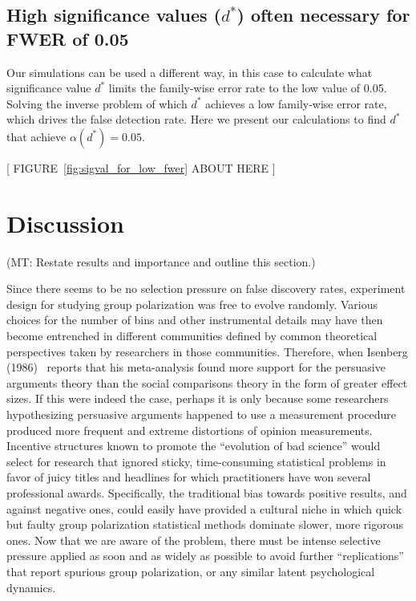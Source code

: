 \documentclass[preview]{article}
\newcommand{\mt}[1]{{\textcolor{myorange} {({\tiny MT:} #1)}}}
\begin{document}
\subsection{High significance values ($d^*$) often necessary for FWER of 0.05}

Our simulations can be used a different way, in this case to calculate what
significance value $d^*$ limits the family-wise error rate to the low value of
0.05. 
Solving the inverse problem of which $d^*$ achieves a low family-wise error rate,
which drives the false detection rate. Here we present our calculations to find
$d^*$ that achieve $\alpha(d^*) = 0.05$. 

\begin{center}
  [  FIGURE~\ref{fig:sigval_for_low_fwer} ABOUT HERE  ] 
\end{center}




\section{Discussion}\label{discussion}

\mt{Restate results and importance and outline this section.}

Since there seems to be no selection pressure on false discovery rates,
experiment design for studying group polarization was free to evolve
randomly. Various choices for the number of bins and other instrumental
details may have then become entrenched in different communities defined by
common theoretical perspectives taken by researchers in those communities.
Therefore, when Isenberg (1986)~\cite{Isenberg1986} reports that his
meta-analysis found more support for the persuasive arguments theory than the 
social comparisons theory in the form of greater effect sizes. If this were
indeed the case, perhaps it is only because some researchers hypothesizing
persuasive arguments happened to use a measurement procedure produced more
frequent and extreme distortions of opinion measurements. Incentive
structures known to promote the ``evolution of bad science'' would select
for research that ignored sticky, time-consuming statistical problems in
favor of juicy titles and headlines for which practitioners have won several
professional awards. Specifically, the traditional bias
towards positive results, and against negative ones, could easily have
provided a cultural niche in which quick but faulty group polarization
statistical methods dominate slower, more rigorous ones.
Now that we are aware of the problem, there must be
intense selective pressure applied as soon and as widely as possible to 
avoid further ``replications'' that report spurious group polarization, or
any similar latent psychological dynamics. 
\end{document}

